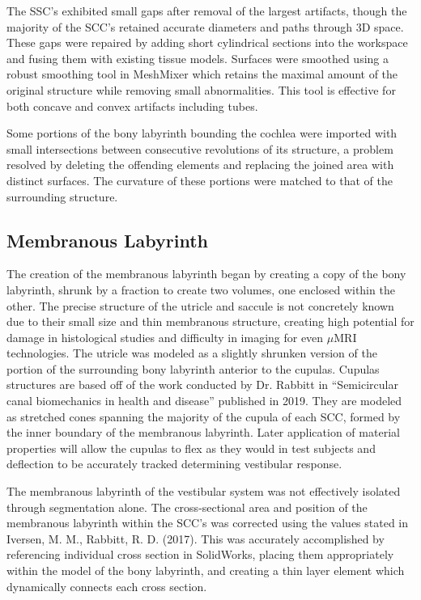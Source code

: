 \documentclass[12pt]{article}
\begin{document}
The SSC’s exhibited small gaps after removal of the largest artifacts, though the majority of the SCC’s retained accurate diameters and paths through 3D space. These gaps were repaired by adding short cylindrical sections into the workspace and fusing them with existing tissue models. Surfaces were smoothed using a robust smoothing tool in MeshMixer which retains the maximal amount of the original structure while removing small abnormalities. This tool is effective for both concave and convex artifacts including tubes. 

Some portions of the bony labyrinth bounding the cochlea were imported with small intersections between consecutive revolutions of its structure, a problem resolved by deleting the offending elements and replacing the joined area with distinct surfaces. The curvature of these portions were matched to that of the surrounding structure.

\subsection{Membranous Labyrinth}
The creation of the membranous labyrinth began by creating a copy of the bony labyrinth, shrunk by a fraction to create two volumes, one enclosed within the other. The precise structure of the utricle and saccule is not concretely known due to their small size and thin membranous structure, creating high potential for damage in histological studies and difficulty in imaging for even $\mu$MRI technologies. The utricle was modeled as a slightly shrunken version of the portion of the surrounding bony labyrinth anterior to the cupulas. Cupulas structures are based off of the work conducted by Dr. Rabbitt in “Semicircular canal biomechanics in health and disease” published in 2019. \cite{rabbitt} They are modeled as stretched cones spanning the majority of the cupula of each SCC, formed by the inner boundary of the membranous labyrinth. Later application of material properties will allow the cupulas to flex as they would in test subjects and deflection to be accurately tracked determining vestibular response.

The membranous labyrinth of the vestibular system was not effectively isolated through segmentation alone. The cross-sectional area and position of the membranous labyrinth within the SCC’s was corrected using the values stated in Iversen, M. M., Rabbitt, R. D. (2017). \cite{iversen} This was accurately accomplished by referencing individual cross section in SolidWorks, placing them appropriately within the model of the bony labyrinth, and creating a thin layer element which dynamically connects each cross section.
\end{document}
